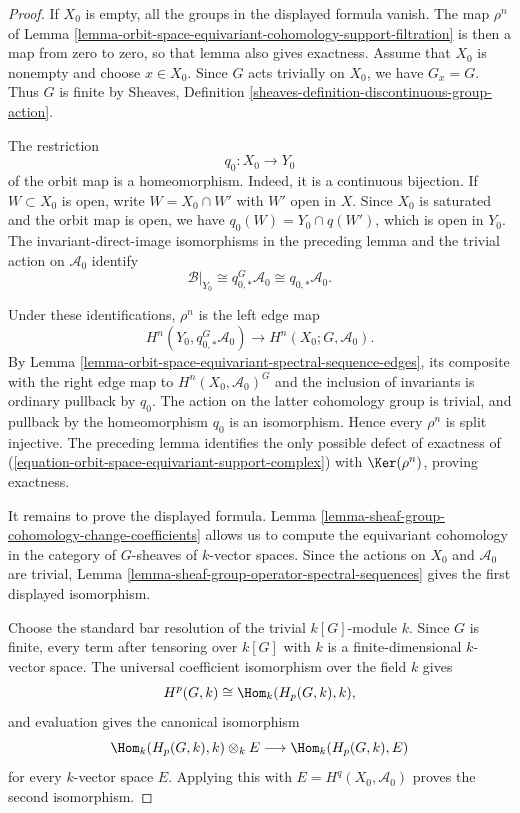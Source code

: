 \begin{proof}
If $X_0$ is empty, all the groups in the displayed formula vanish. The map
$\rho^n$ of Lemma
\ref{lemma-orbit-space-equivariant-cohomology-support-filtration} is then a
map from zero to zero, so that lemma also gives exactness. Assume that
$X_0$ is nonempty and choose $x\in X_0$. Since $G$ acts trivially on
$X_0$, we have $G_x=G$. Thus $G$ is finite by Sheaves, Definition
\ref{sheaves-definition-discontinuous-group-action}.

The restriction
$$
q_0:X_0\longrightarrow Y_0
$$
of the orbit map is a homeomorphism. Indeed, it is a continuous bijection.
If $W\subset X_0$ is open, write $W=X_0\cap W'$ with $W'$ open in $X$.
Since $X_0$ is saturated and the orbit map is open, we have
$q_0(W)=Y_0\cap q(W')$, which is open in $Y_0$. The invariant-direct-image
isomorphisms in the preceding lemma and the trivial action on
$\mathcal{A}_0$ identify
$$
\mathcal{B}|_{Y_0}\cong q_{0,*}^G\mathcal{A}_0
\cong q_{0,*}\mathcal{A}_0.
$$

Under these identifications, $\rho^n$ is the left edge map
$$
H^n(Y_0,q_{0,*}^G\mathcal{A}_0)
\longrightarrow H^n(X_0;G,\mathcal{A}_0).
$$
By Lemma \ref{lemma-orbit-space-equivariant-spectral-sequence-edges}, its
composite with the right edge map to
$H^n(X_0,\mathcal{A}_0)^G$ and the inclusion of invariants is ordinary
pullback by $q_0$. The action on the latter cohomology group is trivial,
and pullback by the homeomorphism $q_0$ is an isomorphism. Hence every
$\rho^n$ is split injective. The preceding lemma identifies the only
possible defect of exactness of
(\ref{equation-orbit-space-equivariant-support-complex}) with
$\Ker(\rho^n)$, proving exactness.

It remains to prove the displayed formula. Lemma
\ref{lemma-sheaf-group-cohomology-change-coefficients} allows us to compute
the equivariant cohomology in the category of $G$-sheaves of
$k$-vector spaces. Since the actions on $X_0$ and $\mathcal{A}_0$ are
trivial, Lemma \ref{lemma-sheaf-group-operator-spectral-sequences} gives
the first displayed isomorphism.

Choose the standard bar resolution of the trivial $k[G]$-module $k$.
Since $G$ is finite, every term after tensoring over $k[G]$ with $k$ is a
finite-dimensional $k$-vector space. The universal coefficient
isomorphism over the field $k$ gives
$$
H^p(G,k)\cong\Hom_k(H_p(G,k),k),
$$
and evaluation gives the canonical isomorphism
$$
\Hom_k(H_p(G,k),k)\otimes_k E
\longrightarrow\Hom_k(H_p(G,k),E)
$$
for every $k$-vector space $E$. Applying this with
$E=H^q(X_0,\mathcal{A}_0)$ proves the second isomorphism.
\end{proof}

